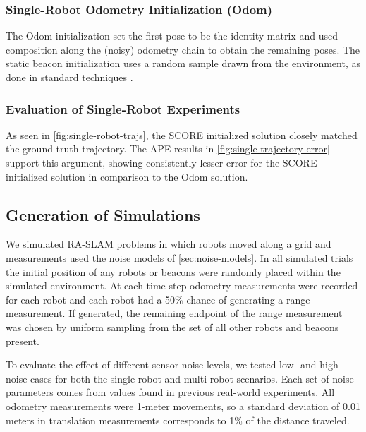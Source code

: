 \SingleRobotGoatsTrajectoryFigure
\SingleRobotGoatAPEBarPlot

\subsubsection{Single-Robot Odometry Initialization (Odom)}
\label{sec:single-robot-odom-init}

The Odom initialization set the first pose to be the identity matrix and used
composition along the (noisy) odometry chain to obtain the remaining poses. The
static beacon initialization uses a random sample drawn from the environment, as
done in standard techniques \cite{Newman03icra,guo2017ijmav}.

\subsubsection{Evaluation of Single-Robot Experiments}

As seen in \cref{fig:single-robot-trajs}, the SCORE initialized solution closely
matched the ground truth trajectory. The APE results in
\cref{fig:single-trajectory-error} support this argument, showing consistently
lesser error for the SCORE initialized solution in comparison to the Odom
solution.

\subsection{Generation of Simulations}
\label{sec:generation-simulated-experiments}


We simulated RA-SLAM problems in which robots moved along a grid and
measurements used the noise models of \cref{sec:noise-models}. In all simulated
trials the initial position of any robots or beacons were randomly placed within
the simulated environment. At each time step odometry measurements were recorded
for each robot and each robot had a 50\% chance of generating a range
measurement. If generated, the remaining endpoint of the range measurement was
chosen by uniform sampling from the set of all other robots and beacons present.

To evaluate the effect of different sensor noise levels, we tested low- and
high-noise cases for both the single-robot and multi-robot scenarios. Each set
of noise parameters comes from values found in previous real-world experiments.
All odometry measurements were 1-meter movements, so a standard deviation of
0.01 meters in translation measurements corresponds to 1\% of the distance
traveled.

